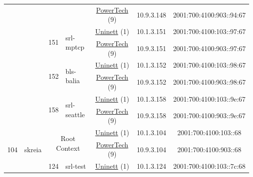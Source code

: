 \begin{small}
\begin{center}
\begin{longtable}{|c|c|c|c|c|c|c|c|}
  &  &  &  & \multicolumn{2}{|c|}{\tiny{\href{http://www.powertech.no}{PowerTech} (9)}} & \tiny{10.9.3.148} & \tiny{2001:700:4100:903::94:67} \\* \cline{3-3}\cline{4-4}\cline{5-5}\cline{6-6}\cline{7-7}\cline{8-8}
  &  & \multirow{2}{*}{\tiny{151}} & \multicolumn{1}{|l|}{\multirow{2}{*}{\tiny{srl-mptcp}}} & \multicolumn{2}{|c|}{\tiny{\href{https://www.uninett.no}{Uninett} (1)}} & \tiny{10.1.3.151} & \tiny{2001:700:4100:103::97:67} \\* \cline{5-5}\cline{6-6}\cline{7-7}\cline{8-8}
  &  &  &  & \multicolumn{2}{|c|}{\tiny{\href{http://www.powertech.no}{PowerTech} (9)}} & \tiny{10.9.3.151} & \tiny{2001:700:4100:903::97:67} \\* \cline{3-3}\cline{4-4}\cline{5-5}\cline{6-6}\cline{7-7}\cline{8-8}
  &  & \multirow{2}{*}{\tiny{152}} & \multicolumn{1}{|l|}{\multirow{2}{*}{\tiny{bls-balia}}} & \multicolumn{2}{|c|}{\tiny{\href{https://www.uninett.no}{Uninett} (1)}} & \tiny{10.1.3.152} & \tiny{2001:700:4100:103::98:67} \\* \cline{5-5}\cline{6-6}\cline{7-7}\cline{8-8}
  &  &  &  & \multicolumn{2}{|c|}{\tiny{\href{http://www.powertech.no}{PowerTech} (9)}} & \tiny{10.9.3.152} & \tiny{2001:700:4100:903::98:67} \\* \cline{3-3}\cline{4-4}\cline{5-5}\cline{6-6}\cline{7-7}\cline{8-8}
  &  & \multirow{2}{*}{\tiny{158}} & \multicolumn{1}{|l|}{\multirow{2}{*}{\tiny{srl-seattle}}} & \multicolumn{2}{|c|}{\tiny{\href{https://www.uninett.no}{Uninett} (1)}} & \tiny{10.1.3.158} & \tiny{2001:700:4100:103::9e:67} \\* \cline{5-5}\cline{6-6}\cline{7-7}\cline{8-8}
  &  &  &  & \multicolumn{2}{|c|}{\tiny{\href{http://www.powertech.no}{PowerTech} (9)}} & \tiny{10.9.3.158} & \tiny{2001:700:4100:903::9e:67} \\ \hline
 \multirow{16}{*}{\tiny{104}} & \multicolumn{1}{|l|}{\multirow{16}{*}{\tiny{skreia}}} & \multicolumn{2}{|c|}{\multirow{2}{*}{\tiny{Root Context}}} & \multicolumn{2}{|c|}{\tiny{\href{https://www.uninett.no}{Uninett} (1)}} & \tiny{10.1.3.104} & \tiny{2001:700:4100:103::68} \\* \cline{5-5}\cline{6-6}\cline{7-7}\cline{8-8}
  &  & \multicolumn{2}{|c|}{} & \multicolumn{2}{|c|}{\tiny{\href{http://www.powertech.no}{PowerTech} (9)}} & \tiny{10.9.3.104} & \tiny{2001:700:4100:903::68} \\* \cline{3-3}\cline{4-4}\cline{5-5}\cline{6-6}\cline{7-7}\cline{8-8}
  &  & \multirow{2}{*}{\tiny{124}} & \multicolumn{1}{|l|}{\multirow{2}{*}{\tiny{srl-test}}} & \multicolumn{2}{|c|}{\tiny{\href{https://www.uninett.no}{Uninett} (1)}} & \tiny{10.1.3.124} & \tiny{2001:700:4100:103::7c:68} \\* \cline{5-5}\cline{6-6}\cline{7-7}\cline{8-8}

\end{longtable}
\end{center}
\end{small}
